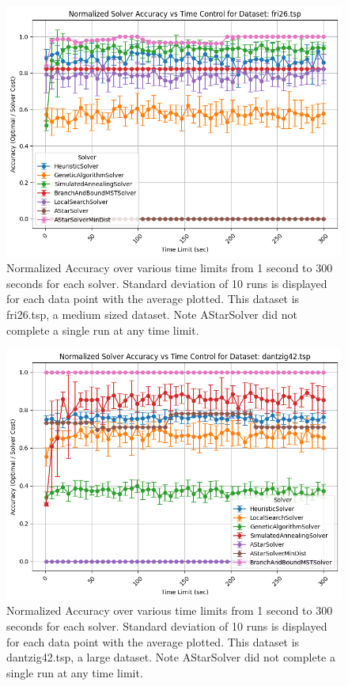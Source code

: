 \documentclass[11pt]{article}
\begin{document}
	\begin{figure}[H]
		\centering
		\includegraphics[width=0.7\linewidth]{figures/accuracy_line_fri26.tsp}
		\caption{Normalized Accuracy over various time limits from 1 second to 300 seconds for each solver. Standard deviation of 10 runs is displayed for each data point with the average plotted. This dataset is fri26.tsp, a medium sized dataset. Note AStarSolver did not complete a single run at any time limit.}
		\label{fig:accuracylinefri26}
	\end{figure}
	\begin{figure}[H]
		\centering
		\includegraphics[width=0.7\linewidth]{figures/accuracy_line_dantzig42.tsp}
		\caption{Normalized Accuracy over various time limits from 1 second to 300 seconds for each solver. Standard deviation of 10 runs is displayed for each data point with the average plotted. This dataset is dantzig42.tsp, a large dataset. Note AStarSolver did not complete a single run at any time limit.}
		\label{fig:accuracylinedantzig42}
	\end{figure}
\end{document}

